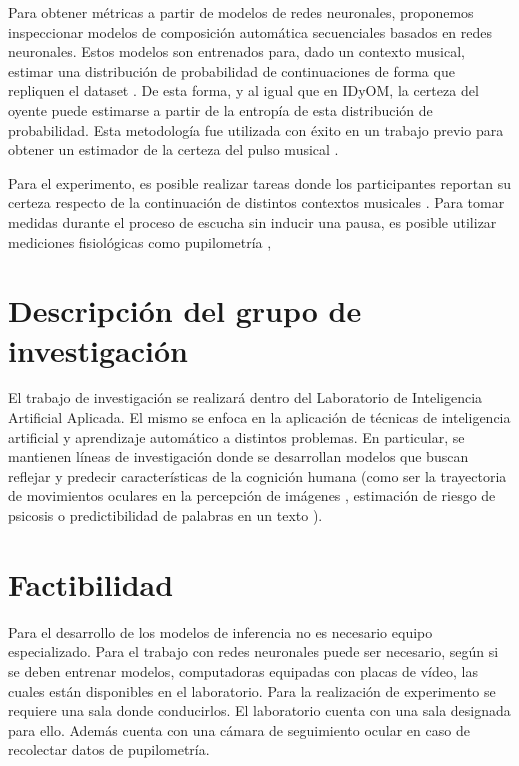 \documentclass[a4paper,11pt]{article}
\begin{document}
Para obtener métricas a partir de modelos de redes neuronales, proponemos
inspeccionar modelos de composición automática secuenciales basados en redes
neuronales. Estos modelos
son entrenados para, dado un contexto musical, estimar una distribución de
probabilidad de continuaciones de forma que repliquen el dataset
\cite{huang2018music}. De esta forma, y al igual que en IDyOM, la certeza del
oyente puede estimarse a partir de la entropía de esta distribución de
probabilidad. Esta metodología fue utilizada con éxito en un trabajo previo
para obtener un estimador de la certeza del pulso musical
\cite{pironio2021clarity}.

Para el experimento, es posible realizar tareas donde los participantes
reportan su certeza respecto de la continuación de distintos contextos
musicales \cite{hansen2014uncertainty}. Para tomar medidas durante el proceso
de escucha sin inducir una pausa, es posible utilizar mediciones fisiológicas
como pupilometría \cite{zhang2020using}, 

\section*{Descripción del grupo de investigación}

El trabajo de investigación se realizará dentro del Laboratorio de Inteligencia
Artificial Aplicada. El mismo se enfoca en la aplicación de técnicas de
inteligencia artificial y aprendizaje automático a distintos problemas. En
particular, se mantienen líneas de investigación donde se desarrollan modelos
que buscan reflejar y predecir características de la cognición humana (como ser
la trayectoria de movimientos oculares en la percepción de imágenes
\cite{bujia2022modeling}, estimación de riesgo de psicosis
\cite{bedi2015psychosis} o predictibilidad de palabras en un texto
\cite{bianchi2020predictability}).

\section*{Factibilidad}

Para el desarrollo de los modelos de inferencia no es necesario equipo
especializado. Para el trabajo con redes neuronales puede ser necesario, según
si se deben entrenar modelos, computadoras equipadas con placas de vídeo, las
cuales están disponibles en el laboratorio. Para la realización de experimento
se requiere una sala donde conducirlos. El laboratorio cuenta con una sala
designada para ello. Además cuenta con una cámara de seguimiento ocular en caso
de recolectar datos de pupilometría.
\end{document}
